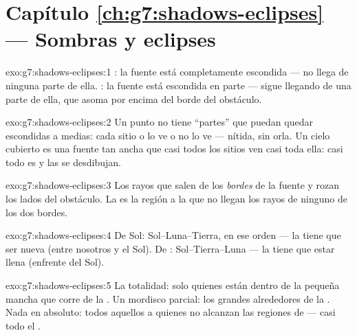 \section*{Capítulo \ref{ch:g7:shadows-eclipses} --- Sombras y eclipses}

\begin{solution}{exo:g7:shadows-eclipses:1}
: la fuente está completamente escondida --- no llega
 de ninguna parte de ella. : la fuente está
escondida en parte --- sigue llegando  de una parte de ella,
que asoma por encima del borde del obstáculo.
\end{solution}

\begin{solution}{exo:g7:shadows-eclipses:2}
Un punto no tiene ``partes'' que puedan quedar escondidas a medias:
cada sitio o lo ve o no lo ve ---  nítida, sin orla. Un cielo
cubierto es una fuente tan ancha que casi todos los sitios ven casi
toda ella: casi todo es  y las  se
desdibujan.
\end{solution}

\begin{solution}{exo:g7:shadows-eclipses:3}
Los rayos que salen de los \emph{bordes} de la fuente y rozan los
lados del obstáculo. La  es la región a la que no llegan los
rayos de ninguno de los dos bordes.
\end{solution}

\begin{solution}{exo:g7:shadows-eclipses:4}
De Sol: Sol--Luna--Tierra, en ese orden --- la  tiene que ser
nueva (entre nosotros y el Sol). De : Sol--Tierra--Luna --- la
 tiene que estar llena (enfrente del Sol).
\end{solution}

\begin{solution}{exo:g7:shadows-eclipses:5}
La totalidad: solo quienes están dentro de la pequeña mancha que corre
de la . Un mordisco parcial: los grandes alrededores de la
. Nada en absoluto: todos aquellos a quienes no alcanzan las
regiones de  --- casi todo el .
\end{solution}

